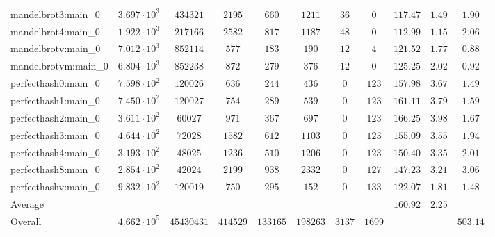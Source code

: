 \begin{tabular}{|l|c|c|c|c|c|c|c|c|c|c|}
mandelbrot3:main\_0            & $ 3.697 \cdot 10^{3} $ & $ 434321   $ & $ 2195   $ & $ 660    $ & $ 1211   $ & $ 36   $ & $ 0    $ & $ 117.47      $ & $ 1.49    $ & $ 1.90    $ \\
mandelbrot4:main\_0            & $ 1.922 \cdot 10^{3} $ & $ 217166   $ & $ 2582   $ & $ 817    $ & $ 1187   $ & $ 48   $ & $ 0    $ & $ 112.99      $ & $ 1.15    $ & $ 2.06    $ \\
mandelbrotv:main\_0            & $ 7.012 \cdot 10^{3} $ & $ 852114   $ & $ 577    $ & $ 183    $ & $ 190    $ & $ 12   $ & $ 4    $ & $ 121.52      $ & $ 1.77    $ & $ 0.88    $ \\
mandelbrotvm:main\_0           & $ 6.804 \cdot 10^{3} $ & $ 852238   $ & $ 872    $ & $ 279    $ & $ 376    $ & $ 12   $ & $ 0    $ & $ 125.25      $ & $ 2.02    $ & $ 0.92    $ \\
perfecthash0:main\_0           & $ 7.598 \cdot 10^{2} $ & $ 120026   $ & $ 636    $ & $ 244    $ & $ 436    $ & $ 0    $ & $ 123  $ & $ 157.98      $ & $ 3.67    $ & $ 1.49    $ \\
perfecthash1:main\_0           & $ 7.450 \cdot 10^{2} $ & $ 120027   $ & $ 754    $ & $ 289    $ & $ 539    $ & $ 0    $ & $ 123  $ & $ 161.11      $ & $ 3.79    $ & $ 1.59    $ \\
perfecthash2:main\_0           & $ 3.611 \cdot 10^{2} $ & $ 60027    $ & $ 971    $ & $ 367    $ & $ 697    $ & $ 0    $ & $ 123  $ & $ 166.25      $ & $ 3.98    $ & $ 1.67    $ \\
perfecthash3:main\_0           & $ 4.644 \cdot 10^{2} $ & $ 72028    $ & $ 1582   $ & $ 612    $ & $ 1103   $ & $ 0    $ & $ 123  $ & $ 155.09      $ & $ 3.55    $ & $ 1.94    $ \\
perfecthash4:main\_0           & $ 3.193 \cdot 10^{2} $ & $ 48025    $ & $ 1236   $ & $ 510    $ & $ 1206   $ & $ 0    $ & $ 123  $ & $ 150.40      $ & $ 3.35    $ & $ 2.01    $ \\
perfecthash8:main\_0           & $ 2.854 \cdot 10^{2} $ & $ 42024    $ & $ 2199   $ & $ 938    $ & $ 2332   $ & $ 0    $ & $ 127  $ & $ 147.23      $ & $ 3.21    $ & $ 3.06    $ \\
perfecthashv:main\_0           & $ 9.832 \cdot 10^{2} $ & $ 120019   $ & $ 750    $ & $ 295    $ & $ 152    $ & $ 0    $ & $ 133  $ & $ 122.07      $ & $ 1.81    $ & $ 1.48    $ \\
\hline
Average                        & $                    $ & $          $ & $        $ & $        $ & $        $ & $      $ & $      $ & $ 160.92      $ & $ 2.25    $ & $         $ \\
\hline
Overall                        & $ 4.662 \cdot 10^{5} $ & $ 45430431 $ & $ 414529 $ & $ 133165 $ & $ 198263 $ & $ 3137 $ & $ 1699 $ & $             $ & $         $ & $ 503.14  $ \\
\hline
\end{tabular}
